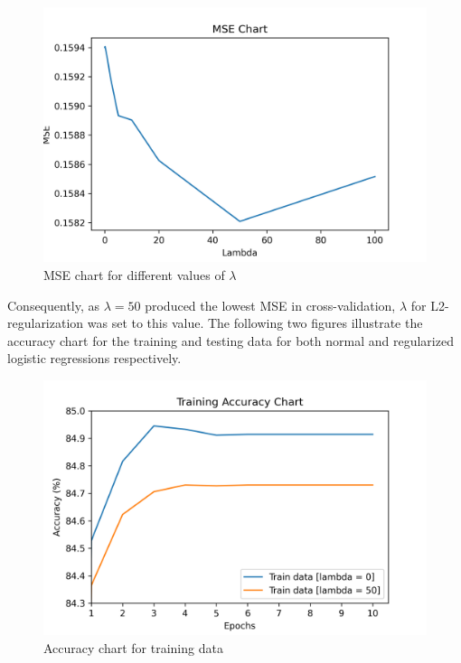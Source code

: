 \documentclass[12pt,a4paper]{article}
\begin{document}
	\vspace{-0.6cm}
	\begin{figure}[H]
		\centering
		\includegraphics[scale=.63]{Figures/MSE}
		\caption{MSE chart for different values of $\lambda$}
	\end{figure}

	\vspace{-0.3cm}
	\noindent Consequently, as $\lambda = 50$ produced the lowest MSE in cross-validation, $\lambda$ for L2-regularization was set to this value. The following two figures illustrate the accuracy chart for the training and testing data for both normal and regularized logistic regressions respectively.

	\vspace{-0.4cm}
	\begin{figure}[H]
		\centering
		\includegraphics[scale=.63]{Figures/Acc_train}
		\caption{Accuracy chart for training data}
	\end{figure}
	
\end{document}
